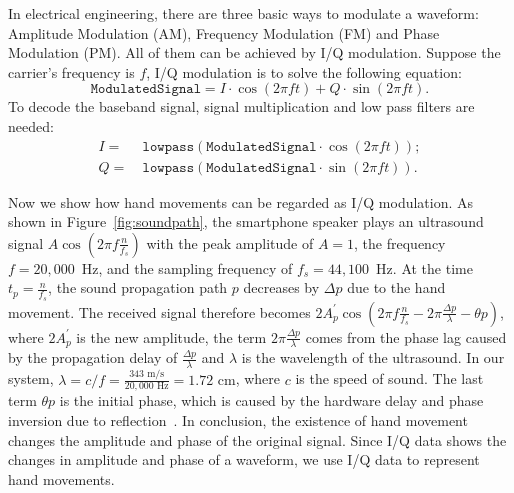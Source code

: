 In electrical engineering, there are three basic ways to modulate a waveform: Amplitude Modulation (AM), Frequency Modulation (FM) and Phase Modulation (PM). All of them can be achieved by I/Q modulation. Suppose the carrier's frequency is $f$, I/Q modulation is to solve the following equation:
\begin{displaymath}
\texttt{ModulatedSignal} = I \cdot \cos(2 \pi f t) + Q \cdot \sin(2 \pi f t) .
\end{displaymath}
To decode the baseband signal, signal multiplication and low pass filters are needed:
\begin{align*}
I =~&\texttt{lowpass} (\texttt{ModulatedSignal}  \cdot  \cos(2 \pi f t) ) ;\\        
Q=~&\texttt{lowpass} (\texttt{ModulatedSignal}  \cdot \sin(2 \pi f t) ) .
\end{align*}

Now we show how hand movements can be regarded as I/Q modulation. As shown in Figure~\ref{fig:soundpath}, the smartphone speaker plays an ultrasound signal $A\cos \left (2\pi f \frac{n}{f_s}\right)$ with the peak amplitude of $A=1$, the frequency $f = 20,000 $~Hz, and the sampling frequency of $f_s = 44,100 $~Hz. At the time $t_p = \frac{n}{f_s}$, the sound propagation path $p$ decreases by $\Delta p$ due to the hand movement. The received signal therefore becomes $2A^\prime_p \cos \left (2\pi f \frac{n}{f_s}  - 2 \pi \frac{\Delta p}{\lambda} - \theta p\right)$, where $2A^\prime_p$ is the new amplitude, the term $2 \pi \frac{\Delta p}{\lambda}$ comes from the phase lag caused by the propagation delay of $\frac{\Delta p}{\lambda}$ and $\lambda$ is the wavelength of the ultrasound. In our system, $\lambda = c/f = \frac{343 \text{~m/s}}{20,000 \text{~Hz}} = 1.72 \text{~cm}$, where $c$ is the speed of sound. The last term $ \theta p$ is the  initial phase, which is caused by the hardware delay and phase inversion due to reflection~\cite{wang2016device}.  
In conclusion, the existence of hand movement changes the amplitude and phase of the original signal. Since I/Q data shows the changes in amplitude and phase of a waveform, we use I/Q data to represent hand movements.

